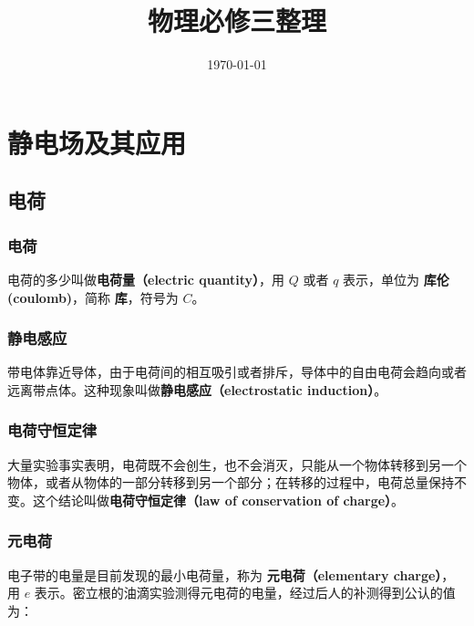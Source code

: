 \documentclass[lang=cn,newtx,10pt,scheme=chinese]{elegantbook}
\title{物理必修三整理}
\date{\today}
\begin{document}
\maketitle
\frontmatter

\tableofcontents

\mainmatter

\setcounter{chapter}{8}
\chapter{静电场及其应用}
\section{电荷}
\subsection{电荷}

\begin{definition}
    电荷的多少叫做\textbf{电荷量（electric quantity）}，用 $Q$ 或者 $q$ 表示，单位为 \textbf{库伦 (coulomb)}，简称  \textbf{库}，符号为 $C$。
\end{definition}

\subsection{静电感应}

带电体靠近导体，由于电荷间的相互吸引或者排斥，导体中的自由电荷会趋向或者远离带点体。这种现象叫做\textbf{静电感应（electrostatic induction）}。

\subsection{电荷守恒定律}

\begin{theorem}
  大量实验事实表明，电荷既不会创生，也不会消灭，只能从一个物体转移到另一个物体，或者从物体的一部分转移到另一个部分；在转移的过程中，电荷总量保持不变。这个结论叫做\textbf{电荷守恒定律（law of conservation of charge）}。
\end{theorem}

\subsection{元电荷}

电子带的电量是目前发现的最小电荷量，称为 \textbf{元电荷（elementary charge）}，用 $e$ 表示。密立根的油滴实验测得元电荷的电量，经过后人的补测得到公认的值为：
\end{document}
